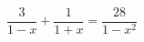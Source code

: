 \begin{ex}[type=equation]
	\begin{condition}
		$\dfrac{3}{1-x} + \dfrac{1}{1+x} = \dfrac{28}{1-x^2}$
	\end{condition}
\end{ex}